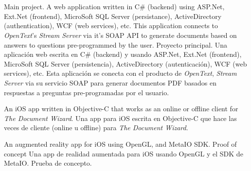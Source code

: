 
\section{}




    {\ml
    {Main project. A web application written in C\# (backend) using ASP.Net,
    Ext.Net (frontend), MicroSoft SQL Server (persistance), ActiveDirectory
    (authentication), WCF (web services), etc. This application connects to
    \textit{OpenText}'s \textit{Stream Server} via it's SOAP API to generate
    documents based on answers to questions pre-programmed by the user.}
    {Proyecto principal. Una aplicación web escrita en C\# (backend) y usando
    ASP.Net, Ext.Net (frontend), MicroSoft SQL Server (persistencia),
    ActiveDirectory (autenticación), WCF (web services), etc. Esta aplicación
    se conecta con el producto de \textit{OpenText}, \textit{Stream Server} via
    su servicio SOAP para generar documentos PDF basados en respuestas a
    preguntas pre-programadas por el usuario.}
}


    {\ml
    {An iOS app written in Objective-C that works as an online or offline client
    for \textit{The Document Wizard}.}
    {Una app para iOS escrita en Objective-C que hace las veces de cliente
    (online u offline) para \textit{The Document Wizard}.}
}


    {\ml
    {An augmented reality app for iOS using OpenGL, and MetaIO SDK. Proof of concept}
    {Una app de realidad aumentada para iOS usando OpenGL y el SDK de MetaIO. Prueba de concepto.}
}


